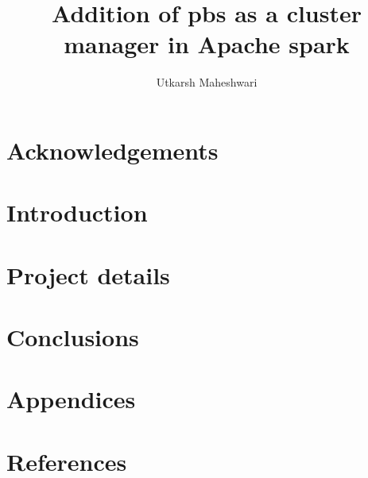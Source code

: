 \documentclass[12pt, a4paper, oneside, titlepage]{report}
\title{Addition of \gls{pbs} as a cluster manager in Apache \gls{spark}}
\author{Utkarsh Maheshwari}
\begin{document}
\makecover
\maketitlepage
\makeabstract

\chapter{Acknowledgements}


\tableofcontents
\addtocounter{chapter}{1}

\chapter{Introduction}


\chapter{Project details}


\chapter{Conclusions}


\chapter{Appendices}


\chapter{References}


\printglossaries
\addtocounter{chapter}{1}
\end{document}
